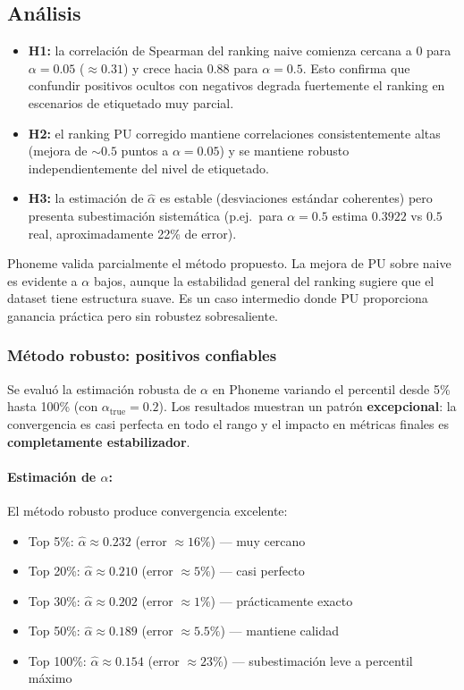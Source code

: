 \documentclass[a4paper,11pt]{article}
\begin{document}
\subsection{Análisis}

\begin{itemize}
    \item \textbf{H1:} la correlación de Spearman del ranking naive comienza cercana a 0 para $\alpha=0.05$ ($\approx 0.31$) y crece hacia $0.88$ para $\alpha=0.5$. Esto confirma que confundir positivos ocultos con negativos degrada fuertemente el ranking en escenarios de etiquetado muy parcial.
    \item \textbf{H2:} el ranking PU corregido mantiene correlaciones consistentemente altas (mejora de $\sim 0.5$ puntos a $\alpha=0.05$) y se mantiene robusto independientemente del nivel de etiquetado.
    \item \textbf{H3:} la estimación de $\hat{\alpha}$ es estable (desviaciones estándar coherentes) pero presenta subestimación sistemática (p.ej.\ para $\alpha=0.5$ estima $0.3922$ vs $0.5$ real, aproximadamente 22\% de error).
\end{itemize}

Phoneme valida parcialmente el método propuesto. La mejora de PU sobre naive es evidente a $\alpha$ bajos, aunque la estabilidad general del ranking sugiere que el dataset tiene estructura suave. Es un caso intermedio donde PU proporciona ganancia práctica pero sin robustez sobresaliente.

\subsubsection{Método robusto: positivos confiables}

Se evaluó la estimación robusta de $\alpha$ en Phoneme variando el percentil desde 5\% hasta 100\% (con $\alpha_{\text{true}}=0.2$). Los resultados muestran un patrón \textbf{excepcional}: la convergencia es casi perfecta en todo el rango y el impacto en métricas finales es \textbf{completamente estabilizador}.

\paragraph{Estimación de $\alpha$:} El método robusto produce convergencia excelente:
\begin{itemize}
    \item Top 5\%: $\hat{\alpha} \approx 0.232$ (error $\approx 16\%$) — muy cercano
    \item Top 20\%: $\hat{\alpha} \approx 0.210$ (error $\approx 5\%$) — casi perfecto
    \item Top 30\%: $\hat{\alpha} \approx 0.202$ (error $\approx 1\%$) — prácticamente exacto
    \item Top 50\%: $\hat{\alpha} \approx 0.189$ (error $\approx 5.5\%$) — mantiene calidad
    \item Top 100\%: $\hat{\alpha} \approx 0.154$ (error $\approx 23\%$) — subestimación leve a percentil máximo
\end{itemize}
\end{document}
